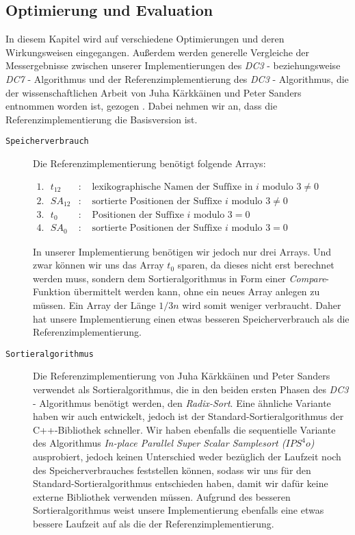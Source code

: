 \subsection{Optimierung und Evaluation}
\label{dc3:optim}

In  diesem Kapitel wird auf verschiedene Optimierungen und deren Wir\-kungs\-wei\-sen eingegangen. Außerdem werden generelle Vergleiche der Mess\-er\-geb\-nis\-se zwischen unserer Implementierungen des \emph{DC3} - beziehungsweise \emph{DC7} - Algorithmus und der Referenzimplementierung des \emph{DC3} - Algorithmus, die der wissenschaftlichen Arbeit von Juha Kärkkäinen und Peter Sanders entnommen worden ist, gezogen \cite[p.~954,955]{saca:9}. Dabei nehmen wir an, dass die Referenzimplementierung die Basisversion ist.

\begin{description}
	\item[\texttt{Speicherverbrauch}]

	Die Referenzimplementierung benötigt folgende Arrays:

	$\begin{array}{lcl}
	1. \text{  } t_{12} & : & \text{ lexikographische Namen der Suffixe in } 	i \text{ modulo } 3 \neq 0\\
	2. \text{  } SA_{12}& : & \text{ sortierte Positionen der Suffixe } 		i \text{ modulo } 3 \neq 0\\
	3. \text{  } t_0	& : & \text{ Positionen der Suffixe } 					i \text{ modulo } 3 = 0\\
	4. \text{  } SA_0	& : & \text{ sortierte Positionen der Suffixe } 		i \text{ modulo } 3 = 0
	\end{array}$

	In unserer Implementierung benötigen wir jedoch nur drei Arrays. Und zwar können wir uns das Array $t_{0}$ sparen, da dieses nicht erst berechnet werden muss, sondern dem Sortieralgorithmus in Form einer \emph{Compare}-Funktion übermittelt werden kann, ohne ein neues Array anlegen zu müssen. Ein Array der Länge $1/3n$ wird somit weniger verbraucht. Daher hat unsere Implementierung einen etwas besseren Speicherverbrauch als die Referenzimplementierung.

	\item[\texttt{Sortieralgorithmus}]

	Die Referenzimplementierung von Juha Kärkkäinen und Peter Sanders verwendet als Sortieralgorithmus, die in den beiden ersten Phasen des \emph{DC3} - Algorithmus benötigt werden, den \emph{Radix-Sort}. Eine ähnliche Variante haben wir auch entwickelt, jedoch ist der Standard-Sortieralgorithmus der C++-Bibliothek schneller. Wir haben ebenfalls die sequentielle Variante des Algorithmus \emph{In-place Parallel Super Scalar Samplesort ($IPS^4o$)} ausprobiert, jedoch keinen Unterschied weder bezüglich der Laufzeit noch des Speicherverbrauches feststellen können, sodass wir uns für den Standard-Sortieralgorithmus entschieden haben, damit wir dafür keine externe Bibliothek verwenden müssen. Aufgrund des besseren Sortieralgorithmus weist unsere Implementierung ebenfalls eine etwas bessere Laufzeit auf als die der Referenzimplementierung.


\end{description}
